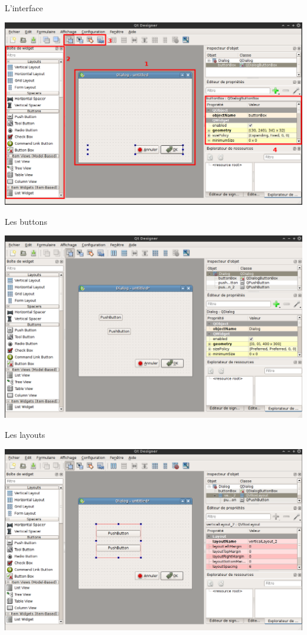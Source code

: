 \documentclass{beamer}
\begin{document}
\begin{frame}[fragile]{L'interface}
 \begin{center}
  \includegraphics[scale=0.30]{InterfaceGenerale.png}
 \end{center}
\end{frame}

\begin{frame}[fragile]{Les buttons}
 \begin{center}
  \includegraphics[scale=0.30]{Sanslayout.png}
 \end{center}
\end{frame}

\begin{frame}[fragile]{Les layouts}
 \begin{center}
  \includegraphics[scale=0.30]{Layout.png}
 \end{center}
\end{frame}
\end{document}
